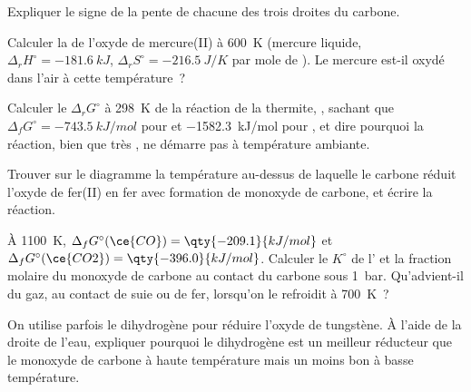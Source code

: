 \begin{exercise}[$\star$]\label{exo:b2:ellingham:4}
Expliquer le signe de la pente de chacune des trois droites du carbone.
\end{exercise}

\begin{exercise}[$\star\star$]\label{exo:b2:ellingham:5}
Calculer la  de l'oxyde de mercure(II) à \qty{600}{K}
(mercure liquide, $\Delta_r H^\circ = \qty{-181.6}{kJ}$, $\Delta_r S^\circ =
\qty{-216.5}{J/K}$ par mole de ). Le mercure est-il oxydé dans l'air à cette
température~?
\end{exercise}

\begin{exercise}[$\star\star$]\label{exo:b2:ellingham:6}
Calculer le $\Delta_r G^\circ$ à \qty{298}{K} de la réaction de la thermite, , sachant que $\Delta_f G^\circ = \qty{-743.5}{kJ/mol}$ pour
 et \qty{-1582.3}{kJ/mol} pour , et dire pourquoi la réaction,
bien que très , ne démarre pas à température ambiante.
\end{exercise}

\begin{exercise}[$\star\star$]\label{exo:b2:ellingham:7}
Trouver sur le diagramme la température au-dessus de laquelle le carbone réduit l'oxyde de fer(II)
en fer avec formation de monoxyde de carbone, et écrire la réaction.
\end{exercise}

\begin{exercise}[$\star\star$]\label{exo:b2:ellingham:8}
À \qty{1100}{K}, $\Delta_f G^\circ(\ce{CO}) = \qty{-209.1}{kJ/mol}$ et
$\Delta_f G^\circ(\ce{CO2}) = \qty{-396.0}{kJ/mol}$. Calculer le $K^\circ$ de
l' et la fraction molaire du monoxyde de carbone au contact du carbone sous
\qty{1}{bar}. Qu'advient-il du gaz, au contact de suie ou de fer, lorsqu'on le
refroidit à \qty{700}{K}~?
\end{exercise}

\begin{exercise}[$\star\star$]\label{exo:b2:ellingham:9}
On utilise parfois le dihydrogène pour réduire l'oxyde de tungstène. À l'aide de la droite de l'eau,
expliquer pourquoi le dihydrogène est un meilleur réducteur que le monoxyde de carbone à haute
température mais un moins bon à basse température.
\end{exercise}

